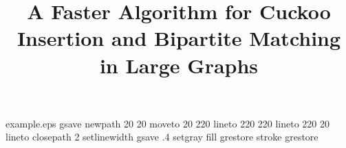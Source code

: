 %
%
%
%
%
\begin{filecontents*}{example.eps}
gsave
newpath
  20 20 moveto
  20 220 lineto
  220 220 lineto
  220 20 lineto
closepath
2 setlinewidth
gsave
  .4 setgray fill
grestore
stroke
grestore
\end{filecontents*}
%
\RequirePackage{fix-cm}
%
\documentclass[smallextended]{svjour3}       %
%
\smartqed  %
%
\usepackage{graphicx}
%
%
%
%
%


\usepackage{color}
\usepackage{amsfonts,amsmath,algorithm,graphicx,subfigure}

\usepackage[noend]{algorithmic}

\newcommand{\la}{\ell}





\title{A Faster Algorithm for Cuckoo Insertion and Bipartite Matching in Large Graphs%
}

